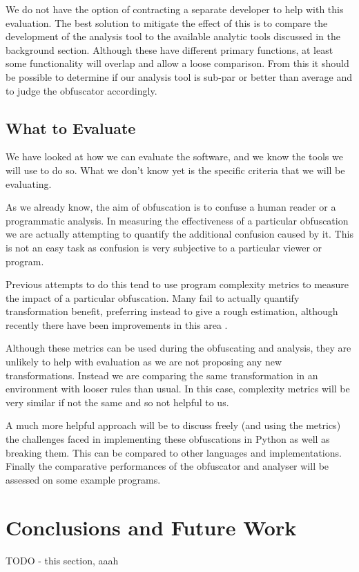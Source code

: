 \documentclass{report}
\begin{document}
We do not have the option of contracting a separate developer to help with this evaluation. The best solution to mitigate the effect
of this is to compare the development of the analysis tool to the available analytic tools discussed in the background section. Although
these have different primary functions, at least some functionality will overlap and allow a loose comparison. From this it
should be possible to determine if our analysis tool is sub-par or better than average and to judge the obfuscator
accordingly.

\subsection{What to Evaluate}

We have looked at how we can evaluate the software, and we know the tools we will use to do so. What we don't know yet is
the specific criteria that we will be evaluating. 

As we already know, the aim of obfuscation is to confuse a human reader or a programmatic analysis. In measuring the effectiveness
of a particular obfuscation we are actually attempting to quantify the additional confusion caused by it. This is not an easy task
as confusion is very subjective to a particular viewer or program.

Previous attempts to do this tend to use program complexity metrics to measure the impact of a particular obfuscation. Many fail to
actually quantify transformation benefit, preferring instead to give a rough estimation, although recently there have been improvements in
this area \cite{obfquant}.

Although these metrics can be used during the obfuscating and analysis, they are unlikely to help with evaluation as we are
not proposing any new transformations. Instead we are comparing the same transformation in an environment with looser rules than usual.
In this case, complexity metrics will be very similar if not the same and so not helpful to us.

A much more helpful approach will be to discuss freely (and using the metrics) the challenges faced in implementing these obfuscations
in Python as well as breaking them. This can be compared to other languages and implementations. Finally the comparative performances
of the obfuscator and analyser will be assessed on some example programs.

\section{Conclusions and Future Work}

TODO - this section, aaah



\end{document}
